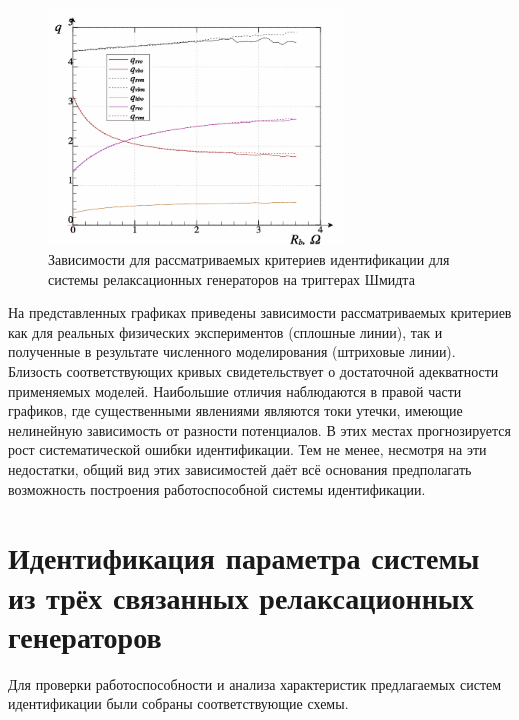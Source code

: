 \begin{figure}[htb!]
  \centerline{\includegraphics[width=0.7\textwidth]{p/relax3ds_read_q-p_q1.png} }
  \caption{Зависимости для рассматриваемых критериев идентификации для системы релаксационных генераторов на триггерах Шмидта}
  \label{atu:f:relax3ds_q}
\end{figure}

На представленных графиках приведены зависимости рассматриваемых критериев
как для реальных физических экспериментов (сплошные линии),
так и полученные в результате численного моделирования (штриховые линии).
Близость соответствующих кривых свидетельствует
о достаточной адекватности применяемых моделей.
Наибольшие отличия наблюдаются в правой части графиков, где существенными
явлениями являются токи утечки, имеющие нелинейную зависимость от разности потенциалов.
В этих местах прогнозируется рост систематической ошибки идентификации.
Тем не менее, несмотря на эти недостатки, общий вид этих зависимостей
даёт всё основания предполагать возможность построения работоспособной системы идентификации.


\section{Идентификация параметра системы из трёх связанных релаксационных генераторов}

Для проверки работоспособности и анализа
характеристик предлагаемых систем идентификации
были собраны соответствующие схемы.

